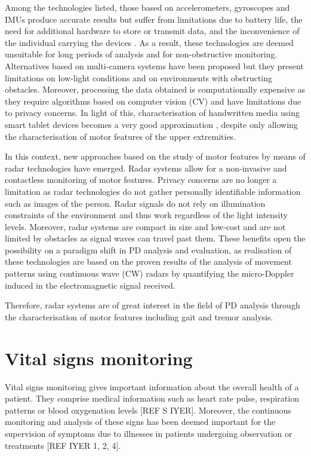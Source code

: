 	Among the technologies listed, those based on accelerometers, gyroscopes and IMUs produce accurate results but suffer from limitations due to battery life, the need for additional hardware to store or transmit data, and the inconvenience of the individual carrying the devices \cite{Biase2020}. As a result, these technologies are deemed unsuitable for long periods of analysis and for non-obstructive monitoring. Alternatives based on multi-camera systems have been proposed \cite{MurodelaHerran2014} but they present limitations on low-light conditions and on environments with obstructing obstacles. Moreover, processing the data obtained is computationally expensive as they require algorithms based on computer vision (CV) and have limitations due to privacy concerns. In light of this, characterisation of handwritten media using smart tablet devices becomes a very good approximation \cite{Danna2019}, despite only allowing the characterisation of motor features of the upper extremities.

	In this context, new approaches based on the study of motor features by means of radar technologies have emerged. Radar systems allow for a non-invasive and contactless monitoring of motor features. Privacy concerns are no longer a limitation as radar technologies do not gather personally identifiable information such as images of the person. Radar signals do not rely on illumination constraints of the environment and thus work regardless of the light intensity levels. Moreover, radar systems are compact in size and low-cost and are not limited by obstacles as signal waves can travel past them. These benefits open the possibility on a paradigm shift in PD analysis and evaluation, as realisation of these technologies are based on the proven results of the analysis of movement patterns using continuous wave (CW) radars \cite{Antolinos2020, Seifert2019} by quantifying the micro-Doppler induced in the electromagnetic signal received.

	Therefore, radar systems are of great interest in the field of PD analysis through the characterisation of motor features including gait and tremor analysis.
	
	
	\section{Vital signs monitoring}
	
	Vital signs monitoring gives important information about the overall health of a patient. They comprise medical information such as heart rate pulse, respiration patterns or blood oxygenation levels [REF S IYER]. Moreover, the continuous monitoring and analysis of these signs has been deemed important for the supervision of symptoms due to illnesses in patients undergoing observation or treatments [REF IYER 1, 2, 4].
	
